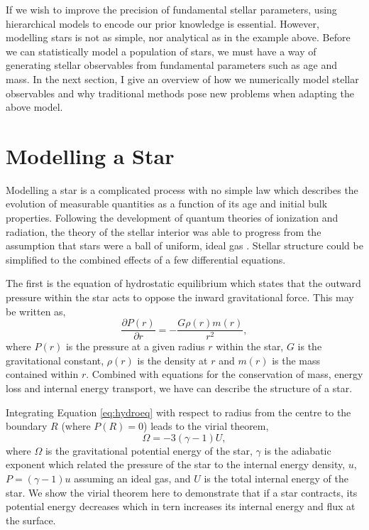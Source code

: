 If we wish to improve the precision of fundamental stellar parameters, using hierarchical models to encode our prior knowledge is essential. However, modelling stars is not as simple, nor analytical as in the example above. Before we can statistically model a population of stars, we must have a way of generating stellar observables from fundamental parameters such as age and mass. In the next section, I give an overview of how we numerically model stellar observables and why traditional methods pose new problems when adapting the above model.

\section{Modelling a Star}\label{sec:models}

Modelling a star is a complicated process with no simple law which describes the evolution of measurable quantities as a function of its age and initial bulk properties. Following the development of quantum theories of ionization and radiation, the theory of the stellar interior was able to progress from the assumption that stars were a ball of uniform, ideal gas \citet{Eddington1926}. Stellar structure could be simplified to the combined effects of a few differential equations.

The first is the equation of hydrostatic equilibrium which states that the outward pressure within the star acts to oppose the inward gravitational force. This may be written as,
\begin{equation}
    \frac{\partial P(r)}{\partial r}=-\frac{G \rho(r) m(r)}{r^{2}},\label{eq:hydroeq}
\end{equation}
where $P(r)$ is the pressure at a given radius $r$ within the star, $G$ is the gravitational constant, $\rho(r)$ is the density at $r$ and $m(r)$ is the mass contained within $r$. Combined with equations for the conservation of mass, energy loss and internal energy transport, we have can describe the structure of a star.

Integrating Equation \ref{eq:hydroeq} with respect to radius from the centre to the boundary $R$ (where $P(R)=0$) leads to the virial theorem,
\begin{equation}
    \Omega = - 3(\gamma - 1) U,
\end{equation}
where $\Omega$ is the gravitational potential energy of the star, $\gamma$ is the adiabatic exponent which related the pressure of the star to the internal energy density, $u$, $P = (\gamma - 1) u$ assuming an ideal gas, and $U$ is the total internal energy of the star. We show the virial theorem here to demonstrate that if a star contracts, its potential energy decreases which in tern increases its internal energy and flux at the surface.

